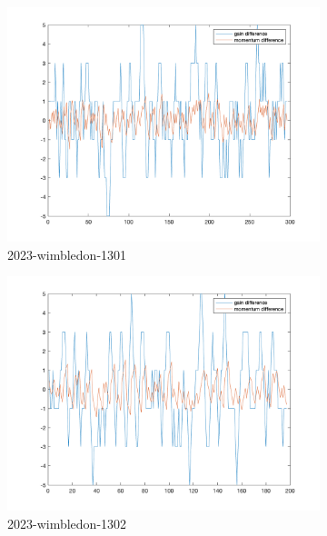 \begin{figure}[H]
    \centering
    \begin{subfigure}[b]{0.34\textwidth}
        \includegraphics[width=\linewidth]{mainmatter/imgs/diff_match1.png}
        \caption{2023-wimbledon-1301}
    \end{subfigure}\hspace{-0.02\textwidth}
    \begin{subfigure}[b]{0.34\textwidth}
        \includegraphics[width=\linewidth]{mainmatter/imgs/diff_match2.png}
        \caption{2023-wimbledon-1302}
    \end{subfigure}\hspace{-0.02\textwidth}
    \begin{subfigure}[b]{0.34\textwidth}

\end{subfigure}
\end{figure}
